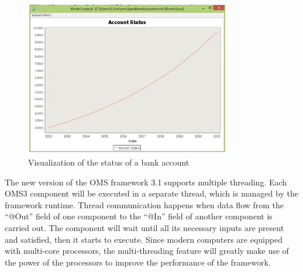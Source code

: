 \begin{figure}[h]
	\centering
	\includegraphics[width=0.8\textwidth]{pics/oms/Figure10.png}
	\caption{Visualization of the status of a bank account
 \label{fig:Visualization_Bank_Account}}	
\end{figure}
The new version of the OMS framework 3.1 supports multiple threading. Each OMS3 component will be executed in a separate thread, which is managed by the framework runtime. Thread communication happens when data flow from the “@Out” field of one component to the “@In” field of another component is carried out. The component will wait until all its necessary inputs are present and satisfied, then it starts to execute. Since modern computers are equipped with multi-core processors, the multi-threading feature will greatly make use of the power of the processors to improve the performance of the framework.
\par
